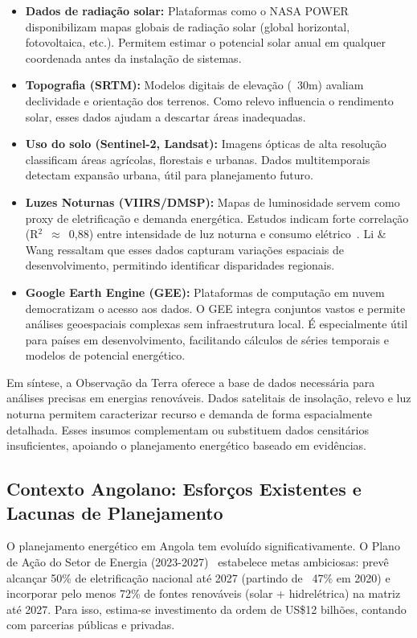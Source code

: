 \documentclass[12pt, a4paper]{article}
\begin{document}
\begin{itemize}
\item \textbf{Dados de radiação solar:} Plataformas como o NASA POWER disponibilizam mapas globais de radiação solar (global horizontal, fotovoltaica, etc.). Permitem estimar o potencial solar anual em qualquer coordenada antes da instalação de sistemas.
\item \textbf{Topografia (SRTM):} Modelos digitais de elevação (~30m) avaliam declividade e orientação dos terrenos. Como relevo influencia o rendimento solar, esses dados ajudam a descartar áreas inadequadas.
\item \textbf{Uso do solo (Sentinel-2, Landsat):} Imagens ópticas de alta resolução classificam áreas agrícolas, florestais e urbanas. Dados multitemporais detectam expansão urbana, útil para planejamento futuro.
\item \textbf{Luzes Noturnas (VIIRS/DMSP):} Mapas de luminosidade servem como proxy de eletrificação e demanda energética. Estudos indicam forte correlação (R$^2$~$\approx$~0,88) entre intensidade de luz noturna e consumo elétrico~\citep{Li2025}. Li \& Wang ressaltam que esses dados capturam variações espaciais de desenvolvimento, permitindo identificar disparidades regionais.
\item \textbf{Google Earth Engine (GEE):} Plataformas de computação em nuvem democratizam o acesso aos dados. O GEE integra conjuntos vastos e permite análises geoespaciais complexas sem infraestrutura local. É especialmente útil para países em desenvolvimento, facilitando cálculos de séries temporais e modelos de potencial energético.
\end{itemize}

Em síntese, a Observação da Terra oferece a base de dados necessária para análises precisas em energias renováveis. Dados satelitais de insolação, relevo e luz noturna permitem caracterizar recurso e demanda de forma espacialmente detalhada. Esses insumos complementam ou substituem dados censitários insuficientes, apoiando o planejamento energético baseado em evidências.

\subsection{Contexto Angolano: Esforços Existentes e Lacunas de Planejamento}

O planejamento energético em Angola tem evoluído significativamente. O Plano de Ação do Setor de Energia (2023-2027)~\citep{governo_angola_2022} estabelece metas ambiciosas: prevê alcançar 50\% de eletrificação nacional até 2027 (partindo de ~47\% em 2020) e incorporar pelo menos 72\% de fontes renováveis (solar + hidrelétrica) na matriz até 2027. Para isso, estima-se investimento da ordem de US\$12 bilhões, contando com parcerias públicas e privadas.
\end{document}
